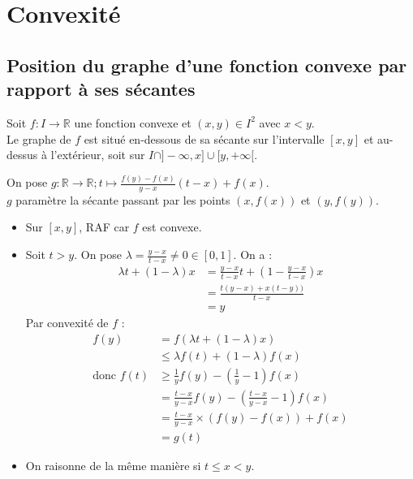 \documentclass[../main.tex]{subfiles}
\begin{document}
\setcounter{chapter}{18}
\chapter{Convexité}
\tableofcontents
\clearpage

\section{Position du graphe d'une fonction convexe par rapport à ses sécantes}
\begin{tcolorbox}[title=Propostion 19.7, title filled=false, colframe=lightblue, colback=lightblue!10!white]
    Soit $f:I\to \mathbb{R}$ une fonction convexe et $(x, y) \in I^2$ avec $x < y$. \\
    Le graphe de $f$ est situé en-dessous de sa sécante sur l'intervalle $[x, y]$ et au-dessus à l'extérieur, soit sur $I \cap ]-\infty, x] \cup [y, +\infty[$.
\end{tcolorbox}

\noindent On pose $g:\mathbb{R}\to \mathbb{R}; t\mapsto \frac{f(y) - f(x)}{y - x}(t - x) + f(x)$. \\
$g$ paramètre la sécante passant par les points $(x, f(x))$ et $(y, f(y))$. \\
\begin{itemize}
    \item Sur $[x, y]$, RAF car $f$ est convexe. 
    \item Soit $t > y$. On pose $\lambda = \frac{y-x}{t-x} \neq 0 \in [0, 1]$. On a : 
    \begin{align*}
        \lambda t + (1-\lambda)x &= \frac{y-x}{t-x}t + \left( 1 - \frac{y-x}{t-x}\right)x \\
        &= \frac{t(y-x) + x(t-y))}{t-x} \\
        &= y
    \end{align*}
    Par convexité de $f$ : 
    \begin{align*}
        f(y) &= f(\lambda t + (1-\lambda)x) \\
        &\leq \lambda f(t) + (1-\lambda)f(x) \\
        \text{donc } f(t) &\geq \frac{1}{y} f(y) - \left( \frac{1}{y} - 1 \right)f(x) \\
        &= \frac{t-x}{y-x} f(y) - \left( \frac{t-x}{y-x} - 1 \right)f(x) \\
        &= \frac{t-x}{y-x} \times (f(y) - f(x)) + f(x) \\
        &= g(t)
    \end{align*}

    \item On raisonne de la même manière si $t \leq x < y$. 
\end{itemize}
\end{document}
